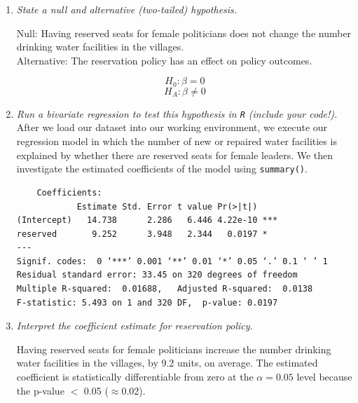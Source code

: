 \documentclass[12pt,letterpaper]{article}
\begin{document}
\begin{enumerate}
	\item [(a)] \textit{State a null and alternative (two-tailed) hypothesis. }
	
	Null: Having reserved seats for female politicians does not change the number drinking water facilities in the villages.\\
	
	Alternative: The reservation policy has an effect on policy outcomes.
	
	$$H_0: \beta = 0$$
	$$H_A: \beta \neq 0$$
	
	\item [(b)] \textit{Run a bivariate regression to test this hypothesis in \texttt{R} (include your code!).}\\
	
					\vspace{.15cm}
	After we load our dataset into our working environment, we execute our regression model in which the number of new or repaired water facilities is explained by whether there are reserved seats for female leaders. We then investigate the estimated coefficients of the model using \texttt{summary()}.\\
	
					\vspace{.15cm}
	  
	\begin{footnotesize}
		
		\begin{verbatim}
	Coefficients:
            Estimate Std. Error t value Pr(>|t|)    
(Intercept)   14.738      2.286   6.446 4.22e-10 ***
reserved       9.252      3.948   2.344   0.0197 *  
---
Signif. codes:  0 ‘***’ 0.001 ‘**’ 0.01 ‘*’ 0.05 ‘.’ 0.1 ‘ ’ 1
Residual standard error: 33.45 on 320 degrees of freedom
Multiple R-squared:  0.01688,	Adjusted R-squared:  0.0138 
F-statistic: 5.493 on 1 and 320 DF,  p-value: 0.0197
		\end{verbatim}
	\end{footnotesize}
	\item [(c)] \textit{Interpret the coefficient estimate for reservation policy.} 
	
				\vspace{.25cm}
	
	Having reserved seats for female politicians increase the number drinking water facilities in the villages, by 9.2 units, on average. The estimated coefficient is statistically differentiable from zero at the $\alpha=0.05$ level because the p-value $<$ 0.05 ($\approx $0.02).
\end{enumerate}
\end{document}
